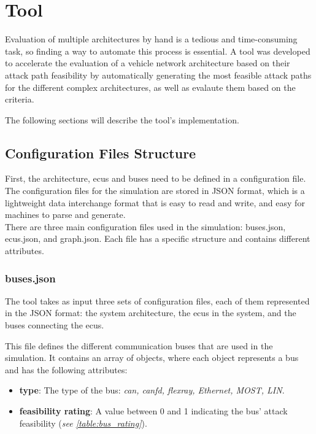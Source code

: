 \chapter{Tool}
\label{chp:tool}

Evaluation of multiple architectures by hand is a tedious and time-consuming task, so finding a way to automate this process is essential.
A tool was developed to accelerate the evaluation of a vehicle network architecture based on their attack path feasibility
by automatically generating the most feasible attack paths for the different complex architectures, as well as evalaute them based on the criteria.

The following sections will describe the tool's implementation.

\section{Configuration Files Structure}
\label{sec:config}

First, the architecture, \gls{ecu}s and buses need to be defined in a configuration file.
The configuration files for the simulation are stored in JSON format, 
which is a lightweight data interchange format that is easy to read and write, and easy for machines to parse and generate.\\

There are three main configuration files used in the simulation: buses.json, ecus.json, and graph.json.
Each file has a specific structure and contains different attributes.

\subsection{buses.json}
\label{sec:buses}

The tool takes as input three sets of configuration files, each of them represented in the JSON format: 
the system architecture, the \gls{ecu}s in the system, and the buses connecting the \gls{ecu}s. 

This file defines the different communication buses that are used in the simulation. 
It contains an array of objects, where each object represents a bus and has the following attributes:

\begin{itemize}
\item \textbf{type}: The type of the bus: \textit{\gls{can}, \gls{canfd}, \gls{flexray}, Ethernet, MOST, LIN}.
\item \textbf{feasibility rating}: A value between 0 and 1 indicating the bus' attack feasibility (\textit{see \ref{table:bus_rating}}).
\end{itemize}

